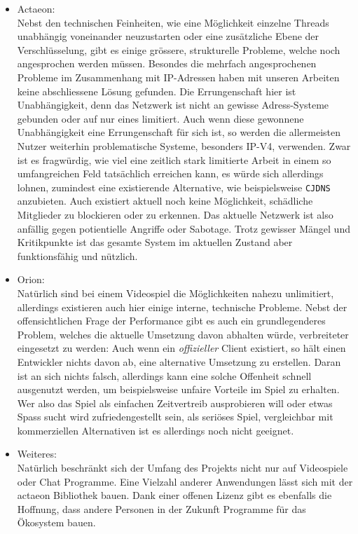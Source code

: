 \documentclass[11pt]{article}
\begin{document}
\begin{itemize}
\item Actaeon: \\
Nebst den technischen Feinheiten, wie eine Möglichkeit einzelne
Threads unabhängig voneinander neuzustarten oder eine zusätzliche
Ebene der Verschlüsselung, gibt es einige grössere, strukturelle
Probleme, welche noch angesprochen werden müssen. Besondes die
mehrfach angesprochenen Probleme im Zusammenhang mit IP-Adressen
haben mit unseren Arbeiten keine abschliessene Lösung gefunden. Die
Errungenschaft hier ist Unabhängigkeit, denn das Netzwerk ist nicht
an gewisse Adress-Systeme gebunden oder auf nur eines limitiert.
Auch wenn diese gewonnene Unabhängigkeit eine Errungenschaft für
sich ist, so werden die allermeisten Nutzer weiterhin problematische
Systeme, besonders IP-V4, verwenden. Zwar ist es fragwürdig, wie
viel eine zeitlich stark limitierte Arbeit in einem so umfangreichen
Feld tatsächlich erreichen kann, es würde sich allerdings lohnen,
zumindest eine existierende Alternative, wie beispielsweise \texttt{CJDNS}
anzubieten. Auch existiert aktuell noch keine Möglichkeit,
schädliche Mitglieder zu blockieren oder zu erkennen. Das aktuelle
Netzwerk ist also anfällig gegen potientielle Angriffe oder
Sabotage. Trotz gewisser Mängel und Kritikpunkte ist das gesamte
System im aktuellen Zustand aber funktionsfähig und nützlich.
\item Orion: \\
Natürlich sind bei einem Videospiel die Möglichkeiten nahezu
unlimitiert, allerdings existieren auch hier einige interne,
technische Probleme. Nebst der offensichtlichen Frage der
Performance gibt es auch ein grundlegenderes Problem, welches die
aktuelle Umsetzung davon abhalten würde, verbreiteter eingesetzt zu
werden: Auch wenn ein \emph{offizieller} Client existiert, so hält einen
Entwickler nichts davon ab, eine alternative Umsetzung zu erstellen.
Daran ist an sich nichts falsch, allerdings kann eine solche
Offenheit schnell ausgenutzt werden, um beispielsweise unfaire
Vorteile im Spiel zu erhalten. Wer also das Spiel als einfachen
Zeitvertreib ausprobieren will oder etwas Spass sucht wird
zufriedengestellt sein, als seriöses Spiel, vergleichbar mit
kommerziellen Alternativen ist es allerdings noch nicht geeignet.
\item Weiteres: \\
Natürlich beschränkt sich der Umfang des Projekts nicht nur auf
Videospiele oder Chat Programme. Eine Vielzahl anderer Anwendungen
lässt sich mit der actaeon Bibliothek bauen. Dank einer offenen
Lizenz gibt es ebenfalls die Hoffnung, dass andere Personen in der
Zukunft Programme für das Ökosystem bauen.
\newpage
\end{itemize}
\end{document}

